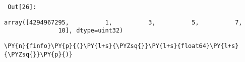         {\par%
        \vspace{-1\smallerfontscale}%
        \noindent%
        \begin{minipage}{\cellleftmargin}%
    \hfill%
    {\smaller%
    \tt%
    \color{nbframe-out-prompt}%
    Out[26]:}%
    \hspace{\inputpadding}%
    \hspace{0em}%
    \hspace{3pt}%
    \end{minipage}%
        }%
    \begin{addmargin}[\cellleftmargin]{0em}%
    {\smaller%
    \vspace{-1\smallerfontscale}%
    
    
    
    \begin{verbatim}
array([4294967295,          1,          3,          5,          7,
               10], dtype=uint32)
    \end{verbatim}

    
}%
    \end{addmargin}%

{\par%
\vspace{-1\baselineskip}%
}%
\begin{notebookcell}[27]%
\begin{addmargin}[\cellleftmargin]{0em}%
{\smaller%
\par%
%
\vspace{-1\smallerfontscale}%
\begin{Verbatim}[commandchars=\\\{\}]
\PY{n}{finfo}\PY{p}{(}\PY{l+s}{\PYZsq{}}\PY{l+s}{float64}\PY{l+s}{\PYZsq{}}\PY{p}{)}
\end{Verbatim}
%
\par%
\vspace{-1\smallerfontscale}}%
\end{addmargin}
\end{notebookcell}

\par\vspace{1\smallerfontscale}%
    
